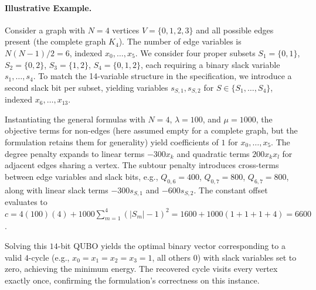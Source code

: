 \documentclass[12pt]{article}
\begin{document}
\paragraph{Illustrative Example.}
Consider a graph with $N=4$ vertices $V=\{0,1,2,3\}$ and all possible edges present (the complete graph $K_4$). The number of edge variables is $N(N-1)/2 = 6$, indexed $x_0,\dots,x_5$. We consider four proper subsets $S_1=\{0,1\}$, $S_2=\{0,2\}$, $S_3=\{1,2\}$, $S_4=\{0,1,2\}$, each requiring a binary slack variable $s_1,\dots,s_4$. To match the 14-variable structure in the specification, we introduce a second slack bit per subset, yielding variables $s_{S,1}, s_{S,2}$ for $S \in \{S_1,\dots,S_4\}$, indexed $x_6,\dots,x_{13}$. 

Instantiating the general formulas with $N=4$, $\lambda=100$, and $\mu=1000$, the objective terms for non-edges (here assumed empty for a complete graph, but the formulation retains them for generality) yield coefficients of $1$ for $x_0,\dots,x_5$. The degree penalty expands to linear terms $-300 x_k$ and quadratic terms $200 x_k x_l$ for adjacent edges sharing a vertex. The subtour penalty introduces cross-terms between edge variables and slack bits, e.g., $Q_{0,6}=400$, $Q_{0,7}=800$, $Q_{6,7}=800$, along with linear slack terms $-300 s_{S,1}$ and $-600 s_{S,2}$. The constant offset evaluates to $c = 4(100)(4) + 1000 \sum_{m=1}^4 (|S_m|-1)^2 = 1600 + 1000(1+1+1+4) = 6600$. 

Solving this $14$-bit QUBO yields the optimal binary vector corresponding to a valid $4$-cycle (e.g., $x_0=x_1=x_2=x_3=1$, all others $0$) with slack variables set to zero, achieving the minimum energy. The recovered cycle visits every vertex exactly once, confirming the formulation's correctness on this instance.
\end{document}
